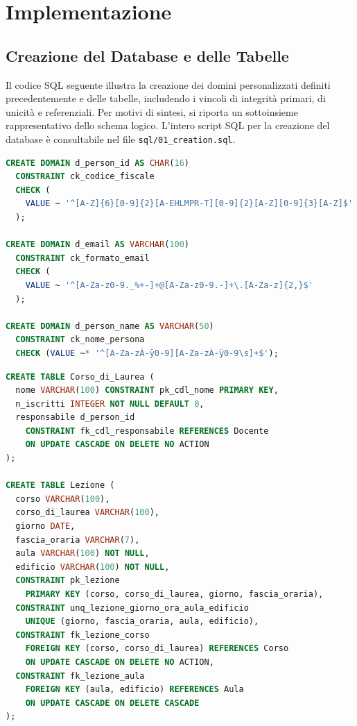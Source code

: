 \documentclass[a4paper,11pt]{article}
\begin{document}
\newpage
\section{Implementazione}
\subsection{Creazione del Database e delle Tabelle}

Il codice SQL seguente illustra la creazione dei domini personalizzati definiti precedentemente e delle tabelle, includendo i vincoli di integrità primari, di unicità e referenziali. Per motivi di sintesi, si riporta un sottoinsieme rappresentativo dello schema logico. L'intero script SQL per la creazione del database è consultabile nel file \texttt{sql/01\_creation.sql}.
\begin{lstlisting}[language=SQL, title={Creazione di domini}]
CREATE DOMAIN d_person_id AS CHAR(16) 
  CONSTRAINT ck_codice_fiscale 
  CHECK (
    VALUE ~ '^[A-Z]{6}[0-9]{2}[A-EHLMPR-T][0-9]{2}[A-Z][0-9]{3}[A-Z]$'
  );

CREATE DOMAIN d_email AS VARCHAR(100) 
  CONSTRAINT ck_formato_email 
  CHECK (
    VALUE ~ '^[A-Za-z0-9._%+-]+@[A-Za-z0-9.-]+\.[A-Za-z]{2,}$'
  );

CREATE DOMAIN d_person_name AS VARCHAR(50) 
  CONSTRAINT ck_nome_persona 
  CHECK (VALUE ~* '^[A-Za-zÀ-ÿ0-9][A-Za-zÀ-ÿ0-9\s]+$');
\end{lstlisting}

\begin{lstlisting}[language=SQL, title={Creazione di tabelle}]
CREATE TABLE Corso_di_Laurea (
  nome VARCHAR(100) CONSTRAINT pk_cdl_nome PRIMARY KEY,
  n_iscritti INTEGER NOT NULL DEFAULT 0,
  responsabile d_person_id 
    CONSTRAINT fk_cdl_responsabile REFERENCES Docente 
    ON UPDATE CASCADE ON DELETE NO ACTION
);

CREATE TABLE Lezione (
  corso VARCHAR(100),
  corso_di_laurea VARCHAR(100),
  giorno DATE,
  fascia_oraria VARCHAR(7),
  aula VARCHAR(100) NOT NULL,
  edificio VARCHAR(100) NOT NULL,
  CONSTRAINT pk_lezione 
    PRIMARY KEY (corso, corso_di_laurea, giorno, fascia_oraria),
  CONSTRAINT unq_lezione_giorno_ora_aula_edificio 
    UNIQUE (giorno, fascia_oraria, aula, edificio),
  CONSTRAINT fk_lezione_corso 
    FOREIGN KEY (corso, corso_di_laurea) REFERENCES Corso 
    ON UPDATE CASCADE ON DELETE NO ACTION,
  CONSTRAINT fk_lezione_aula 
    FOREIGN KEY (aula, edificio) REFERENCES Aula 
    ON UPDATE CASCADE ON DELETE CASCADE
);
\end{lstlisting}
\end{document}
